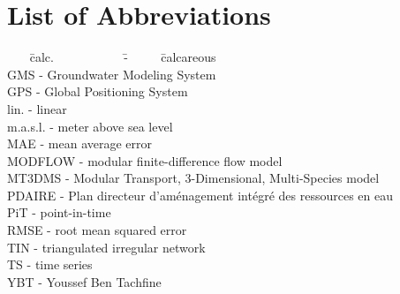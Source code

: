 \chapter*{List of Abbreviations}
\label{Chap-Abbreviations}

\begin{tabbing}

    ~~~ \= calc. ~~~~~~~~~~ \= - ~~~~ \= calcareous\\

    \> GMS \> - \> Groundwater Modeling System\\

    \> GPS \> - \> Global Positioning System\\

    \> lin. \> - \> linear\\

    \> m.a.s.l. \> - \> meter above sea level\\

    \> MAE \> - \> mean average error\\

    \> MODFLOW \> - \>  modular finite-difference
    flow model\\

    \> MT3DMS \> - \> Modular Transport, 3-Dimensional, Multi-Species   model\\

    \> PDAIRE \> - \> Plan directeur d'aménagement intégré des ressources en eau\\

    \> PiT \> - \> point-in-time\\

    \> RMSE \> - \> root mean squared error\\

    \> TIN \> - \> triangulated irregular network\\

    \> TS \> - \> time series\\

    \> YBT \> - \> Youssef Ben Tachfine\\

\end{tabbing}